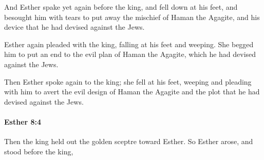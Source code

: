 			\begin{versebox}
					\item[BHS] 
					\item[LXX] 
					\item[ASV] And Esther spake yet again before the king, and fell down at his feet, and besought him with tears to put away the mischief of Haman the Agagite, and his device that he had devised against the Jews.
					\item[NIV] Esther again pleaded with the king, falling at his feet and weeping. She begged him to put an end to the evil plan of Haman the Agagite, which he had devised against the Jews.
					\item[NRSV] Then Esther spoke again to the king; she fell at his feet, weeping and pleading with him to avert the evil design of Haman the Agagite and the plot that he had devised against the Jews.
			\end{versebox}

		\paragraph{Esther 8:4} %
			\label{ESTHER-8-4}

			Then the king held out the golden sceptre toward Esther. So Esther arose, and stood before the king,

